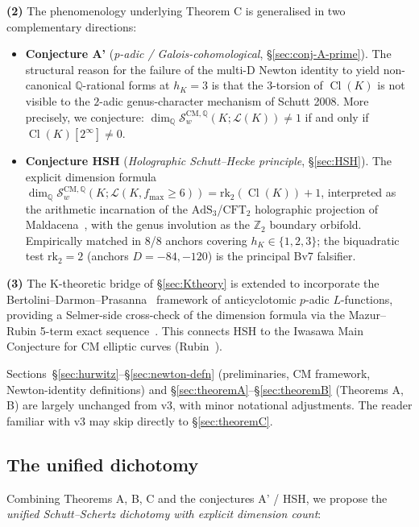 \documentclass[11pt,a4paper]{amsart}
\theoremstyle{definition}
\DeclareMathOperator{\Cl}{Cl}
\newcommand{\Q}{\mathbb{Q}}
\newcommand{\Z}{\mathbb{Z}}
\newcommand{\Lcal}{\mathcal{L}}
\newcommand{\Scal}{\mathcal{S}}
\newcommand{\hK}{h_{K}}
\newcommand{\rktwo}{\mathrm{rk}_2}
\begin{document}
\smallskip\noindent
\textbf{(2)} The phenomenology underlying Theorem C is generalised in two complementary directions:
\begin{itemize}[leftmargin=2em]
  \item \textbf{Conjecture A'} (\emph{p-adic / Galois-cohomological}, \S\ref{sec:conj-A-prime}). The structural reason for the failure of the multi-D Newton identity to yield non-canonical $\Q$-rational forms at $\hK = 3$ is that the $3$-torsion of $\Cl(K)$ is not visible to the $2$-adic genus-character mechanism of Schutt 2008. More precisely, we conjecture: $\dim_\Q \Scal_w^{\mathrm{CM},\Q}(K; \Lcal(K)) \ne 1$ if and only if $\Cl(K)[2^\infty] \ne 0$.
  \item \textbf{Conjecture HSH} (\emph{Holographic Schutt--Hecke principle}, \S\ref{sec:HSH}). The explicit dimension formula $\dim_\Q \Scal_w^{\mathrm{CM},\Q}(K; \Lcal(K, f_{\max} \ge 6)) = \rktwo(\Cl(K)) + 1$, interpreted as the arithmetic incarnation of the $\mathrm{AdS}_3$/$\mathrm{CFT}_2$ holographic projection of Maldacena~\cite{Maldacena1997}, with the genus involution as the $\Z_2$ boundary orbifold. Empirically matched in 8/8 anchors covering $\hK \in \{1, 2, 3\}$; the biquadratic test $\rktwo = 2$ (anchors $D = -84, -120$) is the principal Bv7 falsifier.
\end{itemize}

\smallskip\noindent
\textbf{(3)} The K-theoretic bridge of \S\ref{sec:Ktheory} is extended to incorporate the Bertolini--Darmon--Prasanna~\cite{BDP2013} framework of anticyclotomic $p$-adic $L$-functions, providing a Selmer-side cross-check of the dimension formula via the Mazur--Rubin 5-term exact sequence~\cite{MazurRubin2004}. This connects HSH to the Iwasawa Main Conjecture for CM elliptic curves (Rubin~\cite{Rubin1991}).

Sections~\S\ref{sec:hurwitz}--\S\ref{sec:newton-defn} (preliminaries, CM framework, Newton-identity definitions) and \S\ref{sec:theoremA}--\S\ref{sec:theoremB} (Theorems A, B) are largely unchanged from v3, with minor notational adjustments. The reader familiar with v3 may skip directly to \S\ref{sec:theoremC}.

\subsection{The unified dichotomy}\label{sec:dichotomy-intro}

Combining Theorems A, B, C and the conjectures A' / HSH, we propose the \emph{unified Schutt--Schertz dichotomy with explicit dimension count}:
\end{document}
